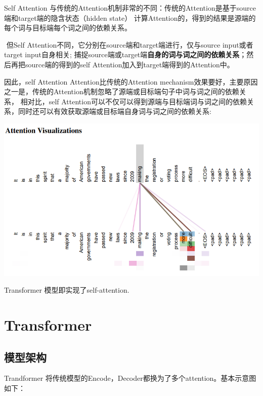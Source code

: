 \documentclass[UTF8,a4paper,10pt]{ctexart}
\begin{document}
   Self Attention 与传统的Attention机制非常的不同：传统的Attention是基于source端和target端的隐含状态（hidden state）
   计算Attention的，得到的结果是源端的每个词与目标端每个词之间的依赖关系。

​    但Self Attention不同，它分别在source端和target端进行，仅与source input或者target input自身相关;
捕捉source端或target端\textbf{自身的词与词之间的依赖关系}；然后再把source端的得到的self Attention加入到target端得到的Attention中。

    因此，self Attention Attention比传统的Attention mechanism效果要好，主要原因之一是，传统的Attention机制忽略了源端或目标端句子中词与词之间的依赖关系，
相对比，self Attention可以不仅可以得到源端与目标端词与词之间的依赖关系，同时还可以有效获取源端或目标端自身词与词之间的依赖关系:

\includegraphics[scale=0.7]{pics/190413-att.png}

Transformer 模型即实现了self-attention.

\section{Transformer}

\subsection{模型架构}

Trandformer 将传统模型的Encode，Decoder都换为了多个attention。基本示意图如下：
\end{document}
